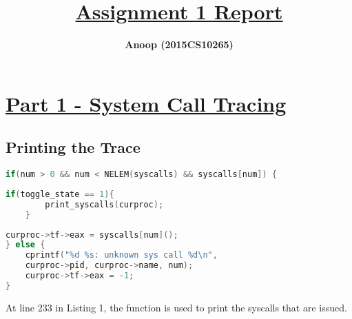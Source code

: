 \documentclass[12pt]{article}
\title{\underline{\textbf{Assignment 1 Report}}}
\author{\textbf{Anoop (2015CS10265)}}
\begin{document}
\maketitle

\section*{\underline{Part 1 - System Call Tracing}}
\subsection*{Printing the Trace}
\begin{addmargin}[0.7in]{0in}
\begin{lstlisting}[language=C,firstnumber=231,caption=Modification in ``{\ttfamily{syscall}}" function - {\ttfamily{syscall.c}},frame=single]
if(num > 0 && num < NELEM(syscalls) && syscalls[num]) {
\end{lstlisting}

\vspace{-\baselineskip}
\begin{lstlisting}[language=C,firstnumber=232,frame=single,backgroundcolor=\color{cream}]
    if(toggle_state == 1){
        print_syscalls(curproc);
    }
\end{lstlisting}

\vspace{-\baselineskip}
\begin{lstlisting}[language=C,firstnumber=235,frame=single]
    curproc->tf->eax = syscalls[num]();
} else {
    cprintf("%d %s: unknown sys call %d\n",
    curproc->pid, curproc->name, num);
    curproc->tf->eax = -1;
}
\end{lstlisting}
\end{addmargin}

\vspace{5mm}
\begin{addmargin}[0.1in]{0in}
    At line $233$ in Listing 1, the function {} is used to print the syscalls that are issued.
\end{addmargin}
\vspace{5mm}
\end{document}
